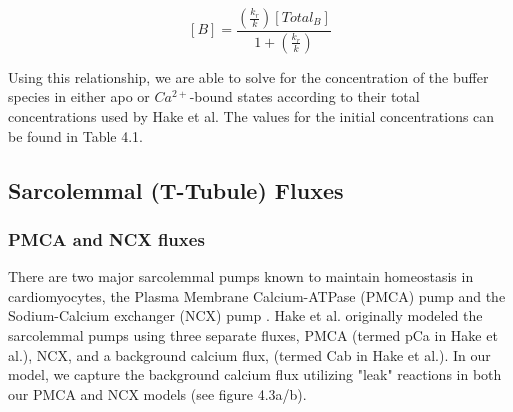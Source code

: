 \documentclass[12pt]{ucsddissertation}
\begin{document}
\begin{equation}
\left[ B\right] = \frac {\left( \frac {k_{r}}{k}\right) \left [Total_{B}\right] }{ 1+\left( \frac {k_{r}}{k}\right) }
\end{equation}

Using this relationship, we are able to solve for the concentration of the buffer species in either apo or $Ca^{2+}$-bound states according to their total concentrations used by Hake et al. The values for the initial concentrations can be found in Table 4.1.
\subsection{Sarcolemmal (T-Tubule) Fluxes}

\subsubsection{PMCA and NCX fluxes}

There are two major sarcolemmal pumps known to maintain homeostasis in cardiomyocytes, the Plasma Membrane Calcium-ATPase (PMCA) pump and the Sodium-Calcium exchanger (NCX) pump \cite{Bers2002}. Hake et al. originally modeled the sarcolemmal pumps using three separate fluxes, PMCA (termed pCa in Hake et al.), NCX, and a background calcium flux, (termed Cab in Hake et al.). In our model, we capture the background calcium flux utilizing "leak" reactions in both our PMCA and NCX models (see figure 4.3a/b). 
\end{document}
